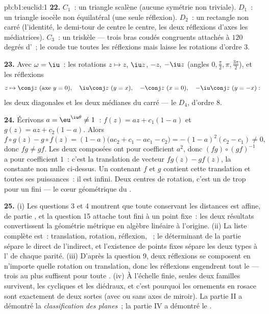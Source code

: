 \begin{solution}{pb:b1:euclid:1}
\textbf{22.} $C_1$~: un triangle scalène (aucune symétrie non
triviale). $D_1$~: un triangle isocèle non équilatéral (une seule
réflexion). $D_2$~: un rectangle non carré (l'identité, le
demi-tour de centre le centre, les deux réflexions d'axes les
médiatrices). $C_3$~: un triskèle --- trois bras coudés
congruents attachés à $120$ degrés d'~; le coude tue
toutes les réflexions mais laisse les rotations d'ordre $3$.

\textbf{23.} Avec $\omega = \iu$~: les rotations $z \mapsto z$,
$\iu z$, $-z$, $-\iu z$ (angles $0, \frac\pi2, \pi,
\frac{3\pi}2$), et les réflexions
\[
z \mapsto \conj z \ (\text{axe } y = 0), \quad
\iu\conj z \ (y = x), \quad
-\conj z \ (x = 0), \quad
-\iu\conj z \ (y = -x):
\]
les deux diagonales et les deux médianes du carré --- le
 $D_4$, d'ordre $8$.

\textbf{24.} Écrivons $a = \eu^{\iu\theta} \neq 1$~: $f(z) = az +
c_1(1 - a)$ et $g(z) = az + c_2(1 - a)$. Alors
\[
f\circ g(z) - g\circ f(z)
= (1-a)\bigl(ac_2 + c_1 - ac_1 - c_2\bigr)
= -(1 - a)^2(c_2 - c_1) \neq 0 ,
\]
donc $f g \neq g f$. Les deux composées ont pour coefficient
 $a^2$, donc $(fg)\circ(gf)^{-1}$ a pour coefficient
 $1$~: c'est la translation de vecteur $fg(z) - gf(z)$, la
constante non nulle ci-dessus. Un  contenant $f$ et $g$
contient cette translation et toutes ses puissances~: il est
infini. Deux centres de rotation, c'est un de trop pour un 
fini --- le cœur géométrique du .

\textbf{25.} (i) Les questions 3 et 4 montrent que toute
 conservant les distances est affine, de partie 
, et la question 15 attache tout  fini à un point
fixe~: les deux résultats convertissent la géométrie métrique en
algèbre linéaire à l'origine. (ii) La liste complète est~:
translation, rotation, réflexion, ~; le déterminant
de la partie  sépare le direct de l'indirect, et
l'existence de points fixes sépare les deux types à l' de
chaque parité. (iii) D'après la question 9, deux réflexions se
composent en n'importe quelle rotation ou translation, donc les
réflexions engendrent tout le  --- trois au plus suffisent
pour toute . (iv) À l'échelle finie, seules deux familles
survivent, les  cycliques et les  diédraux, et c'est
pourquoi les ornements en rosace sont exactement de deux sortes
(avec ou sans axes de miroir). La partie II a démontré la
\emph{classification des  planes}~; la partie IV a
démontré le \emph{}.
\end{solution}
